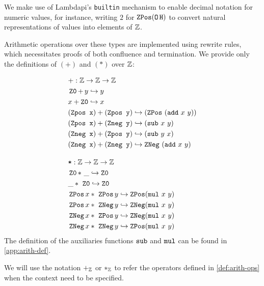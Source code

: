 We make use of Lambdapi's \lstinline[language=Lambdapi,basicstyle=\ttfamily\normalsize]|builtin| mechanism to enable decimal notation for numeric values, for instance, writing $2$ for $\mathop{\texttt{ZPos}} (\mathop{\texttt{O}} \texttt{H})$ to convert natural representations of values into elements of $\mathbb{Z}$.

\begin{definition}\label{def:arith-ops}
Arithmetic operations over these types are implemented using rewrite rules, which necessitates proofs of both confluence and termination.
We provide only the definitions of $(+)$ and $(*)$ over $\mathbb{Z}$:

\begin{align*}
&+: \mathbb{Z} \rightarrow \mathbb{Z} \rightarrow \mathbb{Z} \\
& \mathop{\texttt{Z0}} +\, y \hookrightarrow y \\
& x + \mathop{\texttt{Z0}} \hookrightarrow x \\
& (\texttt{Zpos x}) + (\texttt{Zpos y}) \hookrightarrow (\mathop{\texttt{ZPos}}~(\texttt{add}~x~y))  \\
& (\texttt{Zpos x}) + (\texttt{Zneg y}) \hookrightarrow (\texttt{sub}~x~y)  \\
& (\texttt{Zneg x}) + (\texttt{Zpos y}) \hookrightarrow (\texttt{sub}~y~x)  \\
& (\texttt{Zneg x}) + (\texttt{Zneg y}) \hookrightarrow \mathop{\texttt{ZNeg}}~(\texttt{add}~x~y)\\[1em]
&\texttt{*} : \mathbb{Z} \rightarrow \mathbb{Z} \rightarrow \mathbb{Z} \\
& \mathop{\texttt{Z0}} *~\_ \hookrightarrow \mathop{\texttt{Z0}} \\
& \_ *~\mathop{\texttt{Z0}} \hookrightarrow \mathop{\texttt{Z0}} \\
& \mathop{\texttt{ZPos}} x *~\mathop{\texttt{ZPos}} y \hookrightarrow \mathop{\texttt{ZPos}} (\texttt{mul}~x~y) \\
& \mathop{\texttt{ZPos}} x *~\mathop{\texttt{ZNeg}}    y \hookrightarrow \mathop{\texttt{ZNeg}}    (\texttt{mul}~x~y) \\
& \mathop{\texttt{ZNeg}}    x *~\mathop{\texttt{ZPos}} y \hookrightarrow \mathop{\texttt{ZNeg}}    (\texttt{mul}~x~y) \\
& \mathop{\texttt{ZNeg}}    x *~\mathop{\texttt{ZNeg}}    y \hookrightarrow \mathop{\texttt{ZPos}} (\texttt{mul}~x~y) \\
\end{align*}
The definition of the auxiliaries functions $\texttt{\upshape{sub}}$ and $\texttt{\upshape{mul}}$ can be found in \cref{app:arith-def}.
\end{definition}

\begin{notation}
We will use the notation $+_{\mathbb{Z}}$ or $*_{\mathbb{Z}}$ to refer the operators defined in \cref{def:arith-ops} when the context need to be specified. 
\end{notation}

